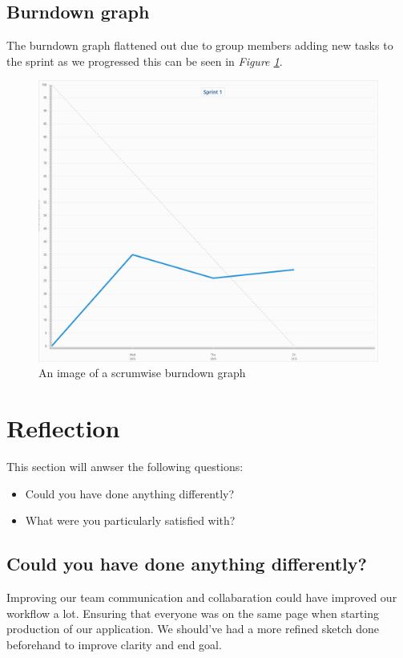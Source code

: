 \documentclass[12pt]{article}
\begin{document}
\subsection{Burndown graph}
The burndown graph flattened out due to group members adding new tasks to the sprint as we progressed this can be seen in
\textit{Figure \ref{fig:BD}}.
\begin{figure}[h]
    \begin{adjustwidth}{-1in}{-1in}
        \centering
        \includegraphics[scale=0.4]{burndown.png}
        \caption{An image of a scrumwise burndown graph}
        \label{fig:BD}
    \end{adjustwidth}
\end{figure}
\clearpage

\section{Reflection}
This section will anwser the following questions:
\begin{itemize}
    \item Could you have done anything differently?
    \item What were you particularly satisfied with?
\end{itemize}

\subsection{Could you have done anything differently?}
Improving our team communication and collabaration could have improved our workflow a lot. Ensuring that everyone was on the 
same page when starting production of our application. We should've had a more refined sketch done beforehand to improve 
clarity and end goal.
\end{document}
